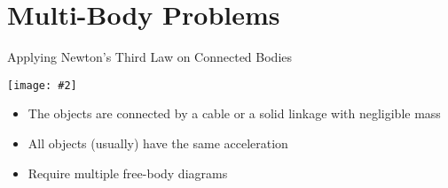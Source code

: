 \documentclass[12pt,compress,aspectratio=169]{beamer}
\newcommand{\pic}[2]{\texttt{[image: \#2]}}
\begin{document}
%
%



\section{Multi-Body Problems}

\begin{frame}{Applying Newton's Third Law on Connected Bodies}
  \begin{center}
    \pic{.7}{graphics/worldslongestroadtrainwithpowertrailer8.jpg}
  \end{center}
  \begin{itemize}
  \item The objects are connected by a cable or a solid linkage with negligible
    mass
  \item All objects (usually) have the same acceleration
  \item Require multiple free-body diagrams
  \end{itemize}
\end{frame}
\end{document}
